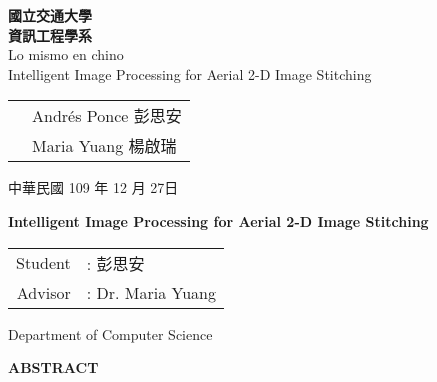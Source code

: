 \documentclass[12pt, a4paper]{article}
\begin{document}
\newcommand{\largeTitle}[1]{\fontsize{40}{50} #1}

\begin{titlepage}
		\begin{center}
			\largeTitle \textbf{國立交通大學} \\[0.25cm]
			\largeTitle \textbf{資訊工程學系} \\[0.25cm]

			\LARGE{Lo mismo en chino} \\[0.5cm]

			\LARGE{Intelligent Image Processing for Aerial 2-D Image Stitching}
		\end{center}

		\vspace{\fill}
		\begin{tabular}{c l}
			{\makebox[8em][s]{\LARGE 大學生}} & \LARGE Andr\'es Ponce 彭思安 \\[0.5cm]
			{\makebox[8em][s]{\LARGE 指導教授}} & \LARGE Maria Yuang 楊啟瑞 \\[0.5cm]
		\end{tabular}

		\vspace{3cm}
		\begin{center}
			{\LARGE 中華民國 109 年 12 月 27日}
		\end{center}
\end{titlepage}

\begin{titlepage}
	\begin{center}
		\LARGE
		\begin{singlespace}
			\textbf{Intelligent Image Processing for Aerial 2-D Image Stitching}
		\end{singlespace}

		\begin{singlespace}
			\begin{tabular}{r l}
					Student &: 彭思安 \\
					Advisor &: Dr. Maria Yuang \\[0.5cm]
			\end{tabular}
		\end{singlespace}

		\begin{singlespace}
				Department of Computer Science\\[0.5cm]
		\end{singlespace}
		\textbf{ABSTRACT} \\[0.5cm]

	\end{center}
	\normalsize
		\hspace{0.6cm} \\[0.7cm]
\end{titlepage}
\end{document}
